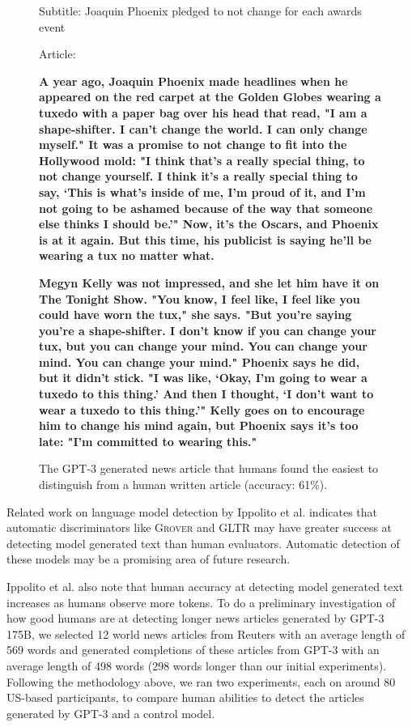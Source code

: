 \documentclass{article}
\begin{document}
\begin{figure}
{{{Subtitle: Joaquin Phoenix pledged to not change for each awards event

Article:}
\textbf{A year ago, Joaquin Phoenix made headlines when he appeared on the red carpet at the Golden Globes wearing a tuxedo with a paper bag over his head that read, "I am a shape-shifter. I can't change the world. I can only change myself." It was a promise to not change to fit into the Hollywood mold: "I think that's a really special thing, to not change yourself. I think it's a really special thing to say, `This is what's inside of me, I'm proud of it, and I'm not going to be ashamed because of the way that someone else thinks I should be.'" Now, it's the Oscars, and Phoenix is at it again. But this time, his publicist is saying he'll be wearing a tux no matter what.}

\textbf{Megyn Kelly was not impressed, and she let him have it on The Tonight Show. "You know, I feel like, I feel like you could have worn the tux," she says. "But you're saying you're a shape-shifter. I don't know if you can change your tux, but you can change your mind. You can change your mind. You can change your mind." Phoenix says he did, but it didn't stick. "I was like, `Okay, I'm going to wear a tuxedo to this thing.' And then I thought, `I don't want to wear a tuxedo to this thing.'" Kelly goes on to encourage him to change his mind again, but Phoenix says it's too late: "I'm committed to wearing this."
}
    }}
\caption{The GPT-3 generated news article that humans found the easiest to distinguish from a human written article (accuracy: 61\%).}
\label{completion:newsgen_worst}
\end{figure} 
 
 Related work on language model detection by Ippolito et al. \cite{ippolito2019automatic} indicates that automatic discriminators like \textsc{Grover} \cite{zellers2019defending} and GLTR \cite{gehrmann2019gltr} may have greater success at detecting model generated text than human evaluators. Automatic detection of these models may be a promising area of future research.
 
Ippolito et al. \cite{ippolito2019automatic} also note that human accuracy at detecting model generated text increases as humans observe more tokens. To do a preliminary investigation of how good humans are at detecting longer news articles generated by GPT-3 175B, we selected 12 world news articles from Reuters with an average length of 569 words and generated completions of these articles from GPT-3 with an average length of 498 words (298 words longer than our initial experiments). Following the methodology above, we ran two experiments, each on around 80 US-based participants, to compare human abilities to detect the articles generated by GPT-3 and a control model.
 
\end{document}

